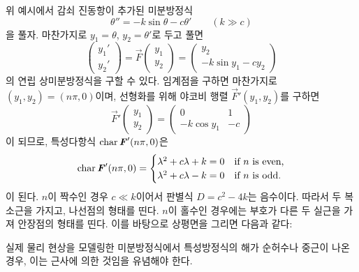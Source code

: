 \documentclass[../engineering_mathematics_lecture_note.tex]{subfiles}
\begin{document}
\begin{example}
    위 예시에서 감쇠 진동항이 추가된 미분방정식
    \begin{equation*}
        \theta'' = -k \sin \theta - c \theta' \qquad (k \gg c)
    \end{equation*}
    을 풀자.
    마찬가지로 $y_1 = \theta$, $y_2 = \theta'$로 두고 풀면
    \begin{equation*}
        \begin{pmatrix}
            y_1' \\ y_2'
        \end{pmatrix} = \vec F \begin{pmatrix}
            y_1 \\ y_2
        \end{pmatrix} = \begin{pmatrix}
            y_2 \\ -k \sin y_1 - c y_2
        \end{pmatrix}
    \end{equation*}
    의 연립 상미분방정식을 구할 수 있다.
    임계점을 구하면 마찬가지로 $(y_1, y_2) = (n\pi, 0)$이며, 선형화를 위해 야코비 행렬 $\vec F'(y_1, y_2)$를 구하면
    \begin{equation*}
        \vec F' \begin{pmatrix}
            y_1 \\ y_2
        \end{pmatrix} = \begin{pmatrix}
        0 & 1\\
        -k \cos y_1 & -c
        \end{pmatrix}
    \end{equation*}
    이 되므로, 특성다항식 $\operatorname{char} \bm{\mathit{F}}' (n \pi, 0)$은
    \begin{equation*}
        \operatorname{char} \bm{\mathit{F}}' (n \pi, 0) = \begin{cases}
            \lambda^2 + c \lambda + k = 0 &\text{if $n$ is even,}\\
            \lambda^2 + c \lambda - k = 0 &\text{if $n$ is odd}.
        \end{cases}
    \end{equation*}
    이 된다.
    $n$이 짝수인 경우 $c \ll k$이어서 판별식 $D = c^2 - 4k$는 음수이다.
    따라서 두 복소근을 가지고, 나선점의 형태를 띤다.
    $n$이 홀수인 경우에는 부호가 다른 두 실근을 가져 안장점의 형태를 띤다.
    이를 바탕으로 상평면을 그리면 다음과 같다:\\
\end{example}

\begin{remark}
    실제 물리 현상을 모델링한 미분방정식에서 특성방정식의 해가 순허수나 중근이 나온 경우, 이는 근사에 의한 것임을 유념해야 한다.
\end{remark}
\end{document}
